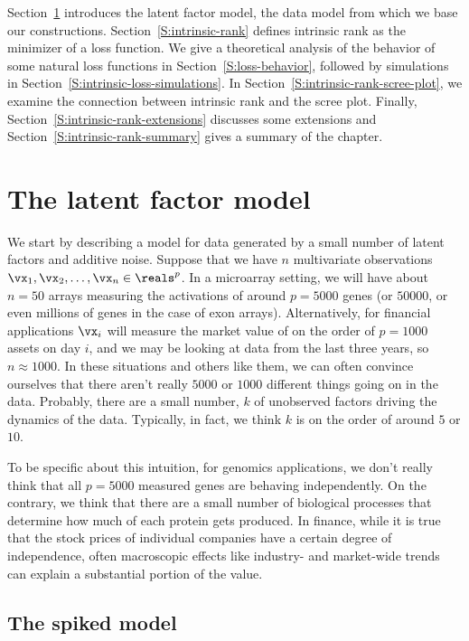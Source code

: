 Section~\ref{S:latent-factor-model} introduces the latent factor model, the
data model from which we base our constructions.
Section~\ref{S:intrinsic-rank} defines intrinsic rank as the minimizer of a
loss function. We give a theoretical analysis of the behavior of some natural
loss functions in Section~\ref{S:loss-behavior}, followed by simulations in
Section~\ref{S:intrinsic-loss-simulations}. In
Section~\ref{S:intrinsic-rank-scree-plot}, we examine the connection between
intrinsic rank and the scree plot. Finally,
Section~\ref{S:intrinsic-rank-extensions} discusses some extensions and
Section~\ref{S:intrinsic-rank-summary} gives a summary of the chapter.


\section{The latent factor model}\label{S:latent-factor-model}

We start by describing a model for data generated by a small number of latent
factors and additive noise. Suppose that we have $n$ multivariate observations
$\vx_{1}, \vx_{2}, \ldots, \vx_{n} \in \reals^p$. In a microarray setting, we
will have about $n=50$ arrays measuring the activations of around $p=5000$ genes (or $50000$, or even millions of genes in the case of exon arrays). Alternatively, for financial applications $\vx_i$ will measure the
market value of on the order of $p=1000$ assets on day $i$, and we may be looking at
data from the last three years, so $n \approx 1000$. In these situations and
others like them, we can often convince ourselves that there aren't really
$5000$ or $1000$ different things going on in the data. Probably, there are a small number, $k$ of unobserved factors driving the dynamics of the data. Typically, in fact, we think $k$ is on the order of around $5$ or $10$.

To be specific about this intuition, for genomics applications, we don't
really think that all $p=5000$ measured genes are behaving independently. On
the contrary, we think that there are a small number of biological processes
that determine how much of each protein gets produced. In finance, while it is
true that the stock prices of individual companies have a certain degree of
independence, often macroscopic effects like industry- and market-wide trends
can explain a substantial portion of the value.

\subsection{The spiked model}

